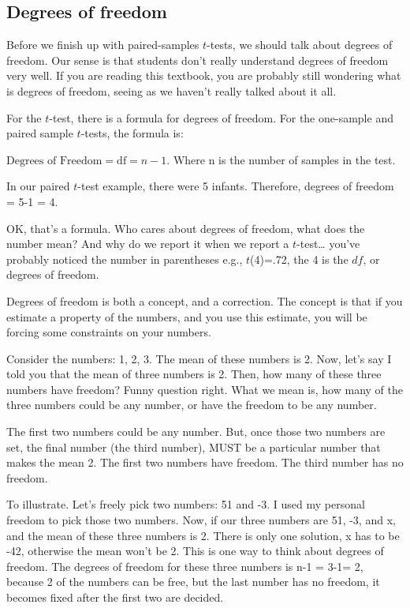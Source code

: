 \documentclass[
  letterpaper,
  DIV=11,
  numbers=noendperiod]{scrreprt}
\begin{document}
\subsection{Degrees of freedom}\label{degrees-of-freedom}

Before we finish up with paired-samples \(t\)-tests, we should talk
about degrees of freedom. Our sense is that students don't really
understand degrees of freedom very well. If you are reading this
textbook, you are probably still wondering what is degrees of freedom,
seeing as we haven't really talked about it all.

For the \(t\)-test, there is a formula for degrees of freedom. For the
one-sample and paired sample \(t\)-tests, the formula is:

\(\text{Degrees of Freedom} = \text{df} = n-1\). Where n is the number
of samples in the test.

In our paired \(t\)-test example, there were 5 infants. Therefore,
degrees of freedom = 5-1 = 4.

OK, that's a formula. Who cares about degrees of freedom, what does the
number mean? And why do we report it when we report a \(t\)-test\ldots{}
you've probably noticed the number in parentheses e.g., \(t\)(4)=.72,
the 4 is the \(df\), or degrees of freedom.

Degrees of freedom is both a concept, and a correction. The concept is
that if you estimate a property of the numbers, and you use this
estimate, you will be forcing some constraints on your numbers.

Consider the numbers: 1, 2, 3. The mean of these numbers is 2. Now,
let's say I told you that the mean of three numbers is 2. Then, how many
of these three numbers have freedom? Funny question right. What we mean
is, how many of the three numbers could be any number, or have the
freedom to be any number.

The first two numbers could be any number. But, once those two numbers
are set, the final number (the third number), MUST be a particular
number that makes the mean 2. The first two numbers have freedom. The
third number has no freedom.

To illustrate. Let's freely pick two numbers: 51 and -3. I used my
personal freedom to pick those two numbers. Now, if our three numbers
are 51, -3, and x, and the mean of these three numbers is 2. There is
only one solution, x has to be -42, otherwise the mean won't be 2. This
is one way to think about degrees of freedom. The degrees of freedom for
these three numbers is n-1 = 3-1= 2, because 2 of the numbers can be
free, but the last number has no freedom, it becomes fixed after the
first two are decided.
\end{document}
